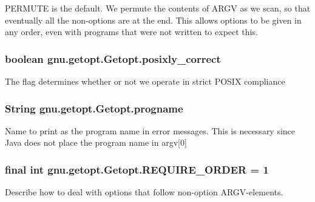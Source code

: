 \label{classgnu_1_1getopt_1_1_getopt_a40d611d25b27cb29cc6f3791882652ab}
PERMUTE is the default. We permute the contents of ARGV as we scan, so that eventually all the non-\/options are at the end. This allows options to be given in any order, even with programs that were not written to expect this. \hypertarget{classgnu_1_1getopt_1_1_getopt_a2500f828284f39e5daf994a11be3ffe5}{
\subsubsection[{posixly\_\-correct}]{\setlength{\rightskip}{0pt plus 5cm}boolean {\bf gnu.getopt.Getopt.posixly\_\-correct}}}
\label{classgnu_1_1getopt_1_1_getopt_a2500f828284f39e5daf994a11be3ffe5}
The flag determines whether or not we operate in strict POSIX compliance \hypertarget{classgnu_1_1getopt_1_1_getopt_aef9686af24b220286d279467d2741a6d}{
\subsubsection[{progname}]{\setlength{\rightskip}{0pt plus 5cm}String {\bf gnu.getopt.Getopt.progname}}}
\label{classgnu_1_1getopt_1_1_getopt_aef9686af24b220286d279467d2741a6d}
Name to print as the program name in error messages. This is necessary since Java does not place the program name in argv\mbox{[}0\mbox{]} \hypertarget{classgnu_1_1getopt_1_1_getopt_a565d6f6705e2d2d1273ee1d5880a0073}{
\subsubsection[{REQUIRE\_\-ORDER}]{\setlength{\rightskip}{0pt plus 5cm}final int {\bf gnu.getopt.Getopt.REQUIRE\_\-ORDER} = 1}}
\label{classgnu_1_1getopt_1_1_getopt_a565d6f6705e2d2d1273ee1d5880a0073}
Describe how to deal with options that follow non-\/option ARGV-\/elements.

